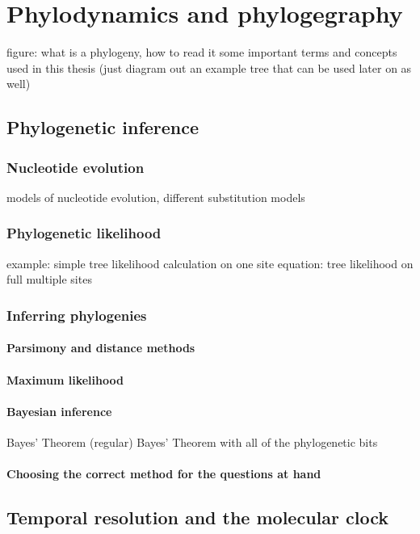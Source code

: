   \section{Phylodynamics and phylogegraphy}
  figure: what is a phylogeny, how to read it
  some important terms and concepts used in this thesis (just diagram out an example tree that can be used later on as well)

    \subsection{Phylogenetic inference}

      \subsubsection{Nucleotide evolution}
      models of nucleotide evolution, different substitution models
      \subsubsection{Phylogenetic likelihood}
      example: simple tree likelihood calculation on one site
      equation: tree likelihood on full multiple sites
      \subsubsection{Inferring phylogenies}
        \paragraph*{Parsimony and distance methods}
        \paragraph*{Maximum likelihood}
        \paragraph*{Bayesian inference}
        Bayes' Theorem (regular)
        Bayes' Theorem with all of the phylogenetic bits
        \paragraph*{Choosing the correct method for the questions at hand}

    \subsection{Temporal resolution and the molecular clock}
